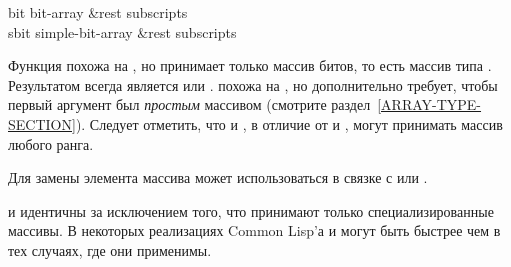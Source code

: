 \begin{defun}[Функция]
bit bit-array &rest subscripts \\
sbit simple-bit-array &rest subscripts

Функция  похожа на , но принимает только массив битов, то
есть массив типа .
Результатом всегда является  или .
 похожа на , но дополнительно требует, чтобы первый аргумент
был \emph{простым} массивом (смотрите раздел~\ref{ARRAY-TYPE-SECTION}).
Следует отметить, что  и , в отличие от  и
, могут принимать массив любого ранга.

Для замены элемента массива может использоваться  в связке с 
или .

 и  идентичны  за исключением того, что принимают
только специализированные массивы.
В некоторых реализациях Common Lisp'а  и  могут быть быстрее
чем  в
тех случаях, где они применимы.
\end{defun}

